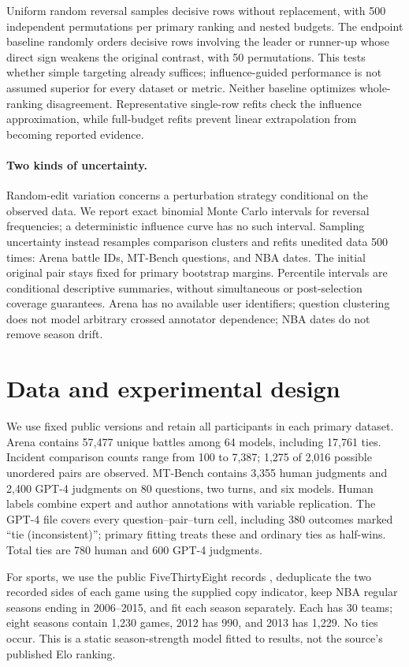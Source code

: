 Uniform random reversal samples decisive rows without replacement, with 500 independent permutations per primary ranking and nested budgets. The endpoint baseline randomly orders decisive rows involving the leader or runner-up whose direct sign weakens the original contrast, with 50 permutations. This tests whether simple targeting already suffices; influence-guided performance is not assumed superior for every dataset or metric. Neither baseline optimizes whole-ranking disagreement. Representative single-row refits check the influence approximation, while full-budget refits prevent linear extrapolation from becoming reported evidence.

\paragraph{Two kinds of uncertainty.}
Random-edit variation concerns a perturbation strategy conditional on the observed data. We report exact binomial Monte Carlo intervals for reversal frequencies; a deterministic influence curve has no such interval. Sampling uncertainty instead resamples comparison clusters and refits unedited data 500 times: Arena battle IDs, MT-Bench questions, and NBA dates. The initial original pair stays fixed for primary bootstrap margins. Percentile intervals are conditional descriptive summaries, without simultaneous or post-selection coverage guarantees. Arena has no available user identifiers; question clustering does not model arbitrary crossed annotator dependence; NBA dates do not remove season drift.

\section{Data and experimental design}
\label{sec:data}
We use fixed public versions and retain all participants in each primary dataset. Arena contains 57,477 unique battles among 64 models, including 17,761 ties. Incident comparison counts range from 100 to 7,387; 1,275 of 2,016 possible unordered pairs are observed. MT-Bench contains 3,355 human judgments and 2,400 GPT-4 judgments on 80 questions, two turns, and six models. Human labels combine expert and author annotations with variable replication. The GPT-4 file covers every question--pair--turn cell, including 380 outcomes marked ``tie (inconsistent)''; primary fitting treats these and ordinary ties as half-wins. Total ties are 780 human and 600 GPT-4 judgments.

For sports, we use the public FiveThirtyEight records \citep{nba}, deduplicate the two recorded sides of each game using the supplied copy indicator, keep NBA regular seasons ending in 2006--2015, and fit each season separately. Each has 30 teams; eight seasons contain 1,230 games, 2012 has 990, and 2013 has 1,229. No ties occur. This is a static season-strength model fitted to results, not the source's published Elo ranking.

